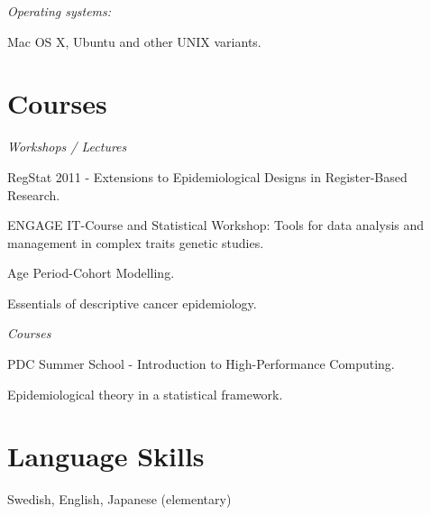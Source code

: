 \halfblankline

\textit{Operating systems:}
\begin{innerlist}
    \item Mac OS X, Ubuntu and other UNIX variants.
\end{innerlist}


%
%
\section{Courses}
\textit{Workshops / Lectures}
\begin{innerlist}
    \item RegStat 2011 - Extensions to Epidemiological Designs in Register-Based Research.
    \item ENGAGE IT-Course and Statistical Workshop: Tools for data analysis and management in complex traits genetic studies.
    \item Age Period-Cohort Modelling.
    \item Essentials of descriptive cancer epidemiology.
\end{innerlist}

\halfblankline

\textit{Courses}
\begin{innerlist}
    \item PDC Summer School - Introduction to High-Performance Computing.
    \item Epidemiological theory in a statistical framework.
\end{innerlist}


%
%
\section{Language Skills}
Swedish, English, Japanese (elementary)

